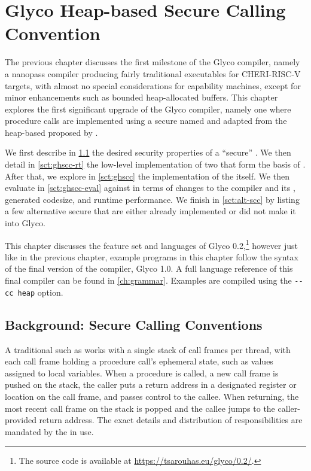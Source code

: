 \documentclass[main.tex]{subfiles}
\begin{document}
\onlyinsubfile{\mainmatter{}}

\chapter{Glyco Heap-based Secure Calling Convention} \label{ch:ghscc}
The previous chapter discusses the first milestone of the Glyco compiler, namely a nanopass compiler producing fairly traditional executables for CHERI-RISC-V targets, with almost no special considerations for capability machines, except for minor enhancements such as bounded heap-allocated buffers. This chapter explores the first significant upgrade of the Glyco compiler, namely one where procedure calls are implemented using a secure  named \textbf{} and adapted from the heap-based  proposed by \citet{cerise}.

We first describe in \cref{sct:scc} the desired security properties of a \enquote{secure} . We then detail in \cref{sct:ghscc-rt} the low-level implementation of two  that form the basis of . After that, we explore in \cref{sct:ghscc} the implementation of the  itself. We then evaluate in \cref{sct:ghscc-eval}  against  in terms of changes to the compiler and its , generated codesize, and runtime performance. We finish in \cref{sct:alt-scc} by listing a few alternative secure  that are either already implemented or did not make it into Glyco.

This chapter discusses the feature set and languages of Glyco 0.2,\footnote{The source code is available at \url{https://tsarouhas.eu/glyco/0.2/}.} however just like in the previous chapter, example programs in this chapter follow the syntax of the final version of the compiler, Glyco 1.0. A full language reference of this final compiler can be found in \cref{ch:grammar}. Examples are compiled using the \texttt{-{}-cc heap} option.

\section{Background: Secure Calling Conventions} \label{sct:scc}
A traditional  such as  works with a single stack of call frames per thread, with each call frame holding a procedure call's ephemeral state, such as values assigned to local variables. When a procedure is called, a new call frame is pushed on the stack, the caller puts a return address in a designated register or location on the call frame, and passes control to the callee. When returning, the most recent call frame on the stack is popped and the callee jumps to the caller-provided return address. The exact details and distribution of responsibilities are mandated by the  in use.
\end{document}
